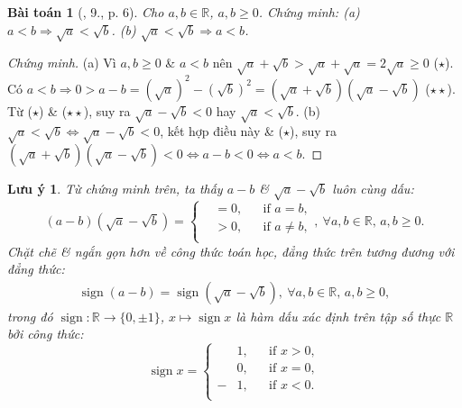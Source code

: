 \documentclass{article}
\newtheorem{baitoan}{Bài toán}
\newtheorem{luuy}{Lưu ý}
\begin{document}
\begin{baitoan}[\cite{SBT_Toan_9_tap_1}, 9., p. 6]
	\label{SBT Toan 9 tap 1 9 p. 6}
	Cho $a,b\in\mathbb{R}$, $a,b\ge0$. Chứng minh: (a) $a < b\Rightarrow\sqrt{a} < \sqrt{b}$. (b) $\sqrt{a} < \sqrt{b}\Rightarrow a < b$. 
\end{baitoan}

\begin{proof}[Chứng minh]
	(a) Vì $a,b\ge0$ \& $a < b$ nên $\sqrt{a} + \sqrt{b} > \sqrt{a} + \sqrt{a} = 2\sqrt{a}\ge0$ ($\star$). Có $a < b\Rightarrow0 > a - b = (\sqrt{a})^2 - (\sqrt{b})^2 = (\sqrt{a} + \sqrt{b})(\sqrt{a} - \sqrt{b})$ ($\star\star$). Từ ($\star$) \& ($\star\star$), suy ra $\sqrt{a} - \sqrt{b} < 0$ hay  $\sqrt{a} < \sqrt{b}$. (b) $\sqrt{a} < \sqrt{b}\Leftrightarrow\sqrt{a} - \sqrt{b} < 0$, kết hợp điều này \& ($\star$), suy ra $(\sqrt{a} + \sqrt{b})(\sqrt{a} - \sqrt{b}) < 0\Leftrightarrow a - b < 0\Leftrightarrow a < b$.
\end{proof}

\begin{luuy}
	Từ chứng minh trên, ta thấy
	$a - b$ \& $\sqrt{a} - \sqrt{b}$ luôn cùng dấu:
	\begin{equation*}
		(a - b)(\sqrt{a} - \sqrt{b}) = \left\{\begin{split}
			&= 0,&&\mbox{if } a = b,\\
			&> 0,&&\mbox{if } a\ne b,\\
		\end{split}\right.,\ \forall a,b\in\mathbb{R},\,a,b\ge0.
	\end{equation*}
	Chặt chẽ \& ngắn gọn hơn về công thức toán học, đẳng thức trên tương đương với đẳng thức:
	\begin{align*}
		\operatorname{sign}(a - b) = \operatorname{sign}(\sqrt{a} - \sqrt{b}),\ \forall a,b\in\mathbb{R},\,a,b\ge0,
	\end{align*}
	trong đó $\operatorname{sign}:\mathbb{R}\to\{0,\pm1\}$, $x\mapsto\operatorname{sign}x$ là \emph{hàm dấu} xác định trên tập số thực $\mathbb{R}$ bởi công thức:
	\begin{equation*}
		\operatorname{sign}x = \left\{\begin{split}
			&1,&&\mbox{if } x > 0,\\
			&0,&&\mbox{if } x = 0,\\
			-&1,&&\mbox{if } x < 0.\\
		\end{split}\right.
	\end{equation*}
\end{luuy}
\end{document}
